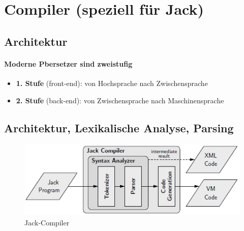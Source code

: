 \documentclass[12pt]{report}
\begin{document}
\section{Compiler (speziell für Jack)}
\subsection{Architektur}
\paragraph{Moderne Pbersetzer sind zweistufig}
\begin{itemize}
  \item \textbf{1. Stufe} (front-end): von Hochsprache nach Zwischensprache
  \item \textbf{2. Stufe} (back-end): von Zwischensprache nach Maschinensprache
\end{itemize}


\subsection{Architektur, Lexikalische Analyse, Parsing}
\begin{figure}[H]
  \caption{Jack-Compiler}
  \label{fig:compiler_front-end}
  \centering
  \includegraphics{compiler_front-end}
\end{figure}
\end{document}
